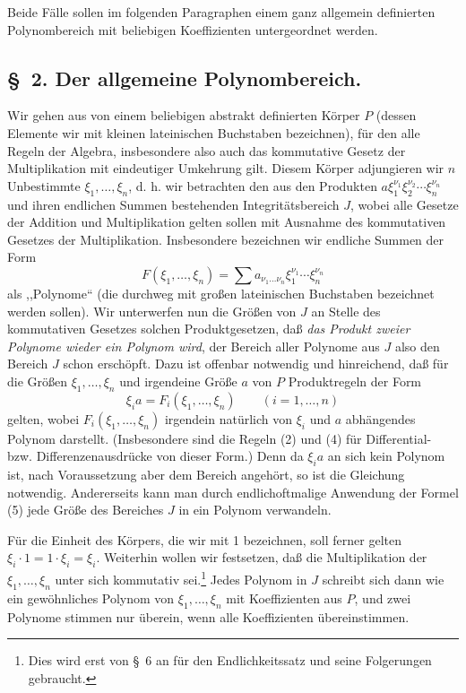 \documentclass[11pt]{article}
\begin{document}
Beide Fälle sollen im folgenden Paragraphen einem ganz allgemein definierten Polynombereich mit beliebigen Koeffizienten untergeordnet werden.

\subsection*{\S~2. Der allgemeine Polynombereich.}

Wir gehen aus von einem beliebigen abstrakt definierten Körper $P$ (dessen Elemente wir mit kleinen lateinischen Buchstaben bezeichnen), für den alle Regeln der Algebra, insbesondere also auch das kommutative Gesetz der Multiplikation mit eindeutiger Umkehrung gilt. Diesem Körper adjungieren wir $n$ Unbestimmte $\xi_1,\ldots,\xi_n$, d. h. wir betrachten den aus den Produkten $a\xi_1^{\nu_1}\xi_2^{\nu_2}\cdots\xi_n^{\nu_n}$ und ihren endlichen Summen bestehenden Integritätsbereich $J$, wobei alle Gesetze der Addition und Multiplikation gelten sollen mit Ausnahme des kommutativen Gesetzes der Multiplikation. Insbesondere bezeichnen wir endliche Summen der Form
\[
 F(\xi_1,\ldots,\xi_n)=\sum a_{\nu_1\ldots\nu_n}\xi_1^{\nu_1}\cdots\xi_n^{\nu_n}
\]
als ,,Polynome`` (die durchweg mit großen lateinischen Buchstaben bezeichnet werden sollen). Wir unterwerfen nun die Größen von $J$ an Stelle des kommutativen Gesetzes solchen Produktgesetzen, daß \emph{das Produkt zweier Polynome wieder ein Polynom wird}, der Bereich aller Polynome aus $J$ also den Bereich $J$ schon erschöpft. Dazu ist offenbar notwendig und hinreichend, daß für die Größen $\xi_1,\ldots,\xi_n$ und irgendeine Größe $a$ von $P$ Produktregeln der Form
\begin{equation}
 \xi_i a=F_i(\xi_1,\ldots,\xi_n)\qquad (i=1,\ldots,n)
\tag{5}
\end{equation}
gelten, wobei $F_i(\xi_1,\ldots,\xi_n)$ irgendein natürlich von $\xi_i$ und $a$ abhängendes Polynom darstellt. (Insbesondere sind die Regeln (2) und (4) für Differential- bzw. Differenzenausdrücke von dieser Form.) Denn da $\xi_i a$ an sich kein Polynom ist, nach Voraussetzung aber dem Bereich angehört, so ist die Gleichung notwendig. Andererseits kann man durch endlichoftmalige Anwendung der Formel (5) jede Größe des Bereiches $J$ in ein Polynom verwandeln.

Für die Einheit des Körpers, die wir mit 1 bezeichnen, soll ferner gelten $\xi_i\cdot1=1\cdot\xi_i=\xi_i$. Weiterhin wollen wir festsetzen, daß die Multiplikation der $\xi_1,\ldots,\xi_n$ unter sich kommutativ sei.\footnote{Dies wird erst von \S~6 an für den Endlichkeitssatz und seine Folgerungen gebraucht.} Jedes Polynom in $J$ schreibt sich dann wie ein gewöhnliches Polynom von $\xi_1,\ldots,\xi_n$ mit Koeffizienten aus $P$, und zwei Polynome stimmen nur überein, wenn alle Koeffizienten übereinstimmen.
\end{document}
